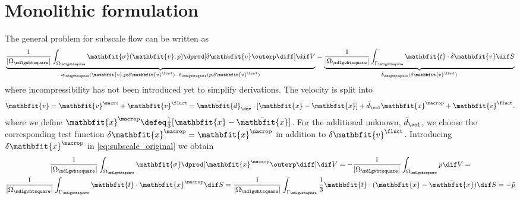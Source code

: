 \documentclass[a4paper,11pt]{article}
\renewcommand{\ta}[1]{\mathbfit{#1}}
\renewcommand{\ts}[1]{\mathbfit{#1}}
\renewcommand{\Box}{\mdlgwhtsquare}
\newcommand{\pressure}{\mathrm{p}}
\begin{document}
\section{Monolithic formulation} \label{sec:monolithic}
The general problem for subscale flow can be written as
\begin{align}
 \underbrace{\frac{1}{|\Omega_\Box|} \int_{\Omega_\Box} \ts\sigma(\ta v, p)\dprod [\delta\ta v\outerp\diff] \dif V}_{a_\Box(\ta v,p;\delta\ta v^\fluct)-b_\Box(p,\delta\ta v^\fluct)}
	= \underbrace{\frac{1}{|\Omega_\Box|} \int_{\Gamma_\Box} \ta t\cdot \delta\ta v\dif S}_{l_\Box(\delta\ta v^\fluct)}
 \label{eq:subscale_original}
\end{align}
where incompressibility has not been introduced yet to simplify derivations.
The velocity is split into
\begin{align}
 \ta v = \ta v^\macro + \ta v^\fluct = \bar{\ts d}_\dev \cdot [\ta x - \bar{\ta x}] + \bar{d}_\vol \ta x^{\macro\pressure} + \ta v^\fluct.
\end{align}
where we define $\ta x^{\macro\pressure} \defeq \frac13[\ta x - \bar{\ta x}]$.
For the additional unknown, $\bar{d}_\vol$, we choose the corresponding test function $\delta\ta x^{\macro\pressure} = \ta x^{\macro\pressure}$ in addition to $\delta \ta v^\fluct$.
Introducing $\delta\ta x^{\macro\pressure}$ in \eqref{eq:subscale_original} we obtain
\begin{multline}
  \frac{1}{|\Omega_\Box|}
	\int_{\Omega_\Box} \ts\sigma\dprod [\ta x^{\macro\pressure}\outerp\diff] \dif V
 =
-\frac{1}{|\Omega_\Box|}
	\int_{\Omega_\Box} p \dif V
 = \\
  \frac{1}{|\Omega_\Box|}
 \int_{\Gamma_\Box} \ta t\cdot \ta x^{\macro\pressure} \dif S = \frac{1}{|\Omega_\Box|} \int_{\Gamma_\Box}\frac13 \ta t\cdot(\ta x-\bar{\ta x}) \dif S = -\bar{p}
\end{multline}
\end{document}

